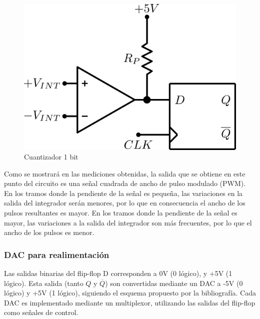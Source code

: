 \documentclass[assd_tp3_main.tex]{subfiles}
\begin{document}
\begin{figure}[!ht]
\begin{centering}
\includegraphics[scale=0.5]{images/ej5/Comp.png}
\par\end{centering}
\caption{Cuantizador 1 bit}
\end{figure}

Como se mostrará en las mediciones obtenidas, la salida que se obtiene en este punto del circuito es una señal cuadrada de ancho de pulso modulado (PWM). En los tramos donde la pendiente de la señal es pequeña, las variaciones en la salida del integrador serán menores, por lo que en consecuencia el ancho de los pulsos resultantes es mayor. En los tramos donde la pendiente de la señal es mayor, las variaciones a la salida del integrador son más frecuentes, por lo que el ancho de los pulsos es menor.

\subsubsection{DAC para realimentación}

Las salidas binarias del flip-flop D corresponden a 0V (0 lógico), y +5V (1 lógico). Esta salida (tanto $Q$ y $\overline{Q}$) son convertidas mediante un DAC a -5V (0 lógico) y +5V (1 lógico), siguiendo el esquema propuesto por la bibliografía. Cada DAC es implementado mediante un multiplexor, utilizando las salidas del flip-flop como señales de control.
\end{document}
